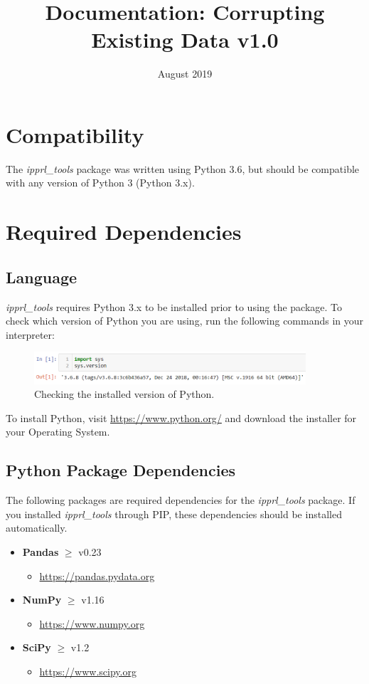\documentclass[titlepage, 11pt]{article}
\title{\pkgname{} Documentation: Corrupting Existing Data v1.0}
\date{August 2019}
\newcommand{\pkgname}{\textit{ipprl\_tools}}
\begin{document}
\maketitle

\tableofcontents
\section{Compatibility}
The \pkgname{} package was written using Python 3.6, but should be compatible with any version of Python 3 (Python 3.x).

\section{Required Dependencies}

\subsection{Language}
\pkgname{} requires Python 3.x to be installed prior to using the package. To check which version of Python you are using, run the following commands in your interpreter:
\begin{figure}[H]
    \centering
    \includegraphics[width=0.9\textwidth]{imgs/Python_ver.PNG}
    \caption{Checking the installed version of Python.}
    \label{fig:pythver}
\end{figure}

\noindent To install Python, visit \url{https://www.python.org/} and download the installer for your Operating System.

\subsection{Python Package Dependencies}
The following packages are required dependencies for the \pkgname{} package. If you installed \pkgname{} through PIP, these dependencies should be installed automatically.

    \begin{itemize}
        \item \textbf{Pandas} $\geq$ v0.23
        \begin{itemize}
            \item \url{https://pandas.pydata.org}
        \end{itemize}
        \item \textbf{NumPy} $\geq$ v1.16
        \begin{itemize}
            \item \url{https://www.numpy.org}
        \end{itemize}
        \item \textbf{SciPy} $\geq$ v1.2
        \begin{itemize}
            \item \url{https://www.scipy.org}
        \end{itemize}
    \end{itemize}
\end{document}
